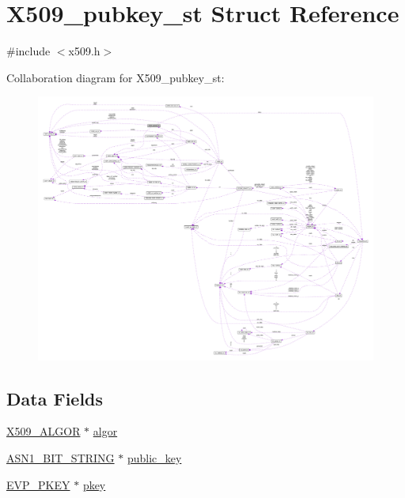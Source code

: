 \hypertarget{struct_x509__pubkey__st}{}\section{X509\+\_\+pubkey\+\_\+st Struct Reference}
\label{struct_x509__pubkey__st}


{\ttfamily \#include $<$x509.\+h$>$}



Collaboration diagram for X509\+\_\+pubkey\+\_\+st\+:\nopagebreak
\begin{figure}[H]
\begin{center}
\leavevmode
\includegraphics[width=350pt]{struct_x509__pubkey__st__coll__graph}
\end{center}
\end{figure}
\subsection*{Data Fields}
\begin{DoxyCompactItemize}
\item 
\hyperlink{crypto_2ossl__typ_8h_aa2b6185e6254f36f709cd6577fb5022e}{X509\+\_\+\+A\+L\+G\+OR} $\ast$ \hyperlink{struct_x509__pubkey__st_a22b96fe8b8a2f288e3672f438d25b232}{algor}
\item 
\hyperlink{crypto_2ossl__typ_8h_af837aaa00e151b1e8773aea5a8fe1cc4}{A\+S\+N1\+\_\+\+B\+I\+T\+\_\+\+S\+T\+R\+I\+NG} $\ast$ \hyperlink{struct_x509__pubkey__st_a1121509a74c2a9e9de7edc781d512f61}{public\+\_\+key}
\item 
\hyperlink{crypto_2ossl__typ_8h_a2fca4fef9e4c7a2a739b1ea04acb56ce}{E\+V\+P\+\_\+\+P\+K\+EY} $\ast$ \hyperlink{struct_x509__pubkey__st_ad6e367842646f43c91845fb952047fe3}{pkey}
\end{DoxyCompactItemize}


